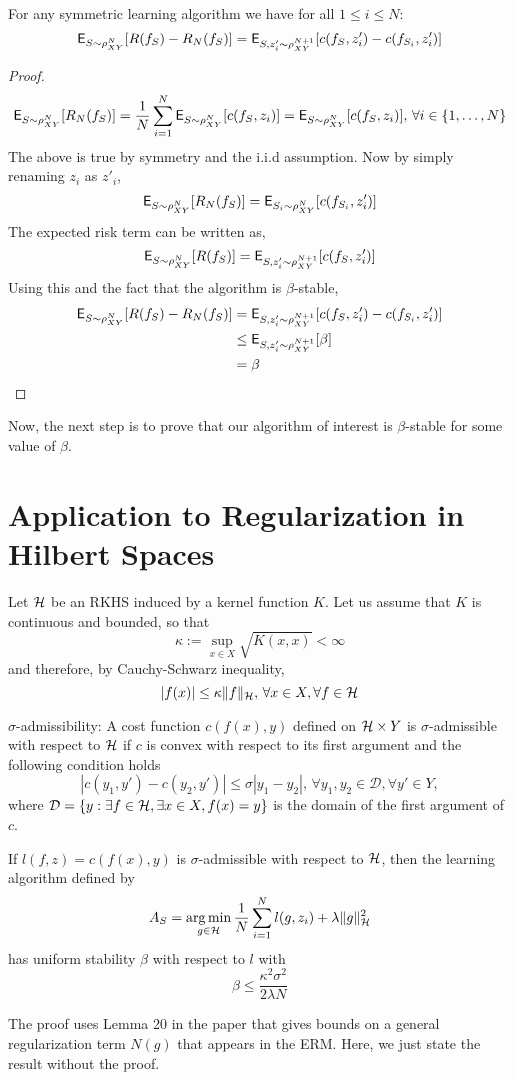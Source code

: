 \begin{lemma}
	For any symmetric learning algorithm we have for all $1\leq i \leq N$:
	\[
	{\sf E}_{S \sim \rho^N_{XY}} [R(f_S) - R_N(f_S)] = {\sf E}_{S,z'_i \sim \rho^{N+1}_{XY}} [c(f_S,z'_i) - c(f_{S_i}, z'_i)]
	\]
	\begin{proof}
		\[
		{\sf E}_{S \sim \rho^N_{XY}} [R_N(f_S)] = \frac{1}{N} \sum_{i=1}^N {\sf E}_{S \sim \rho^N_{XY}} [c(f_S, z_i)] = {\sf E}_{S \sim \rho^N_{XY}} [c(f_S, z_i)], \, \forall i \in \{1,\dots, N\}
		\]
		The above is true by symmetry and the i.i.d assumption. Now by simply renaming $z_i$ as $z'_i$,
		\[
		{\sf E}_{S \sim \rho^N_{XY}}[R_N(f_S)] = {\sf E}_{S_i \sim \rho^N_{XY}}[c(f_{S_i}, z'_i)]
		\]
		The expected risk term can be written as, 
		\[
		{\sf E}_{S \sim \rho^N_{XY}}[R(f_S)] = {\sf E}_{S,z'_i \sim \rho^{N+1}_{XY}} [c(f_S, z'_i)]
		\]
		Using this and the fact that the algorithm is $\beta$-stable, 
		\[
		\begin{aligned}
		{\sf E}_{S \sim \rho^N_{XY}} [R(f_S) - R_N(f_S)] &= {\sf E}_{S,z'_i\sim \rho^{N+1}_{XY}}[c(f_S,z'_i) - c(f_{S_i},z'_i)]\\
		&\leq {\sf E}_{S,z'_i\sim \rho^{N+1}_{XY}}[\beta] \\
		& = \beta
		\end{aligned}
		\]
	\end{proof}
\end{lemma}
Now, the next step is to prove that our algorithm of interest is $\beta$-stable for some value of $\beta$. 

\section{Application to Regularization in Hilbert Spaces}
Let ${\cal H}$ be an RKHS induced by a kernel function $K$. Let us assume that $K$ is continuous and bounded, so that
\[
\kappa := \sup_{x \in X} \sqrt{K(x,x)} < \infty
\]
and therefore, by Cauchy-Schwarz inequality,
\begin{equation}
|f(x)| \leq \kappa \|f\|_\clH, \, \forall x \in X, \forall f \in \clH 
\label{e:cauchy_schwarz}
\end{equation}

\noindent $\sigma$-admissibility: A cost function $c(f(x),y)$ defined on ${\cal H} \times Y$ is $\sigma$-admissible with respect to ${\cal H}$ if $c$ is convex with respect to its first argument and the following condition holds
\[
|c(y_1, y') - c(y_2, y')| \leq \sigma |y_1 - y_2|, \, \forall y_1,y_2 \in \mathcal{D}, \forall y' \in Y,
\]
where $\mathcal{D} = \{y: \exists f \in {\cal H}, \exists x \in X, f(x) = y\}$ is the domain of the first argument of $c$.  

\noindent \begin{theorem}
	If $l(f,z) = c(f(x),y)$ is $\sigma$-admissible with respect to ${\cal H}$, then the learning algorithm defined by 
	\[
	A_S = \mathop{\rm arg{\,}min}_{g \in {\cal H}} \frac{1}{N} \sum_{i=1}^N l(g, z_i) + \lambda \|g\|^2_{\cal H}
	\]
	has uniform stability $\beta$ with respect to $l$ with
	\[
	\beta \leq \frac{\kappa^2 \sigma^2}{2 \lambda N}
	\]
\end{theorem}
The proof uses Lemma 20 in the paper that gives bounds on a general regularization term $N(g)$ that appears in the ERM. Here, we just state the result without the proof. 

